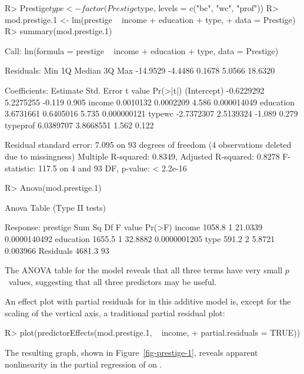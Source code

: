 \documentclass[article]{jss}
\begin{document}
\begin{Schunk}
\begin{Sinput}
R> Prestige$type <- factor(Prestige$type, levels = c("bc", "wc", "prof"))
R> mod.prestige.1 <- lm(prestige ~ income + education + type,
+    data = Prestige)
R> summary(mod.prestige.1)
\end{Sinput}
\begin{Soutput}
Call:
lm(formula = prestige ~ income + education + type, data = Prestige)

Residuals:
     Min       1Q   Median       3Q      Max 
-14.9529  -4.4486   0.1678   5.0566  18.6320 

Coefficients:
              Estimate Std. Error t value    Pr(>|t|)
(Intercept) -0.6229292  5.2275255  -0.119       0.905
income       0.0010132  0.0002209   4.586 0.000014049
education    3.6731661  0.6405016   5.735 0.000000121
typewc      -2.7372307  2.5139324  -1.089       0.279
typeprof     6.0389707  3.8668551   1.562       0.122

Residual standard error: 7.095 on 93 degrees of freedom
  (4 observations deleted due to missingness)
Multiple R-squared:  0.8349,	Adjusted R-squared:  0.8278 
F-statistic: 117.5 on 4 and 93 DF,  p-value: < 2.2e-16
\end{Soutput}
\begin{Sinput}
R> Anova(mod.prestige.1)
\end{Sinput}
\begin{Soutput}
Anova Table (Type II tests)

Response: prestige
          Sum Sq Df F value       Pr(>F)
income    1058.8  1 21.0339 0.0000140492
education 1655.5  1 32.8882 0.0000001205
type       591.2  2  5.8721     0.003966
Residuals 4681.3 93                     
\end{Soutput}
\end{Schunk}
%
The ANOVA table for the model reveals that all three terms have very
small $p$~values, suggesting that all three predictors may be useful.

An effect plot with partial residuals for  in this
additive model is, except for the scaling of the vertical axis, a
traditional partial residual plot:
%
\begin{Schunk}
\begin{Sinput}
R> plot(predictorEffects(mod.prestige.1, ~ income,
+    partial.residuals = TRUE))
\end{Sinput}
\end{Schunk}
%
The resulting graph, shown in Figure~\ref{fig-prestige-1}, reveals apparent nonlinearity in the partial regression of  on .
\end{document}
